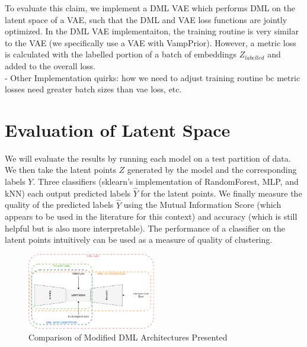 \documentclass[./dissertation.tex]{subfiles}
\begin{document}
    To evaluate this claim, we implement a DML VAE which performs DML on the latent space of a VAE, such that the DML and VAE loss functions are jointly optimized. In the DML VAE implementaiton, the training routine is very similar to the VAE (we specifically use a VAE with VampPrior). However, a metric loss is calculated with the labelled portion of a batch of embeddings $Z_{labelled}$ and added to the overall loss. \\
    
    - Other Implementation quirks: how we need to adjust training routine bc metric losses need greater batch sizes than vae loss, etc.
    \section{Evaluation of Latent Space}
    We will evaluate the results by running each model on a test partition of data. We then take the latent points $Z$ generated by the model and the corresponding labels $Y$. Three classifiers (sklearn's implementation of RandomForest, MLP, and kNN) each output predicted labels $\hat{Y}$ for the latent points. We finally measure the quality of the predicted labels $\hat{Y}$ using the Mutual Information Score (which appears to be used in the literature for this context) and accuracy (which is still helpful but is also more interpretable). The performance of a classifier on the latent points intuitively can be used as a measure of quality of clustering.


    \begin{figure}[h]
        \centering\includegraphics[width=0.5\textwidth]{figures/DML_Arcs.drawio.png}
        \caption{Comparison of Modified DML Architectures Presented}
        \label{Triplet Loss Diagram}
    \end{figure}

    
\end{document}
